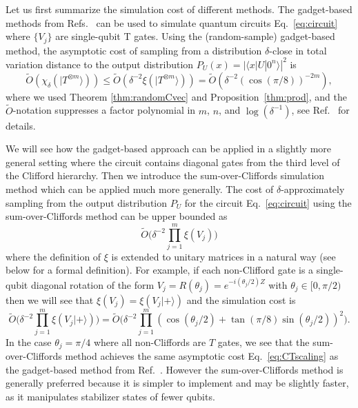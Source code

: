 Let us first summarize the simulation cost of different methods. The gadget-based methods from Refs.~\cite{Bravyi16stabRank, bravyi2016improved} can be used to simulate quantum circuits Eq.~\eqref{eq:circuit} where $\{V_j\}$ are single-qubit T gates. Using the (random-sample) gadget-based method, the asymptotic cost of sampling from a distribution $\delta$-close in total variation distance to the output distribution $P_U(x)=|\langle x|U|0^n\rangle|^2$ is
\begin{equation}
\tilde{O}\left(\chi_{\delta}\left(|T^{\otimes m}\rangle\right)\right)\leq \tilde{O}\left(\delta^{-2} \xi\left(|T^{\otimes m}\rangle\right)\right)=\tilde{O}\left(\delta^{-2}\left(\cos(\pi/8)\right)^{-2m}\right),
\label{eq:CTscaling}
\end{equation}
where we used Theorem \ref{thm:randomCvec} and Proposition~\ref{thm:prod}, and the $\tilde{O}$-notation suppresses a factor polynomial in $m$, $n$, and $\log(\delta^{-1})$, see Ref.~\cite{bravyi2016improved} for details. 


We will see how the gadget-based approach can be applied in a slightly more general setting where the circuit contains diagonal gates from the third level of the Clifford hierarchy. Then we introduce the sum-over-Cliffords simulation method which can be applied much more generally.  The cost of $\delta$-approximately sampling from the output distribution $P_U$ for the circuit Eq.~\eqref{eq:circuit} using the sum-over-Cliffords method can be upper bounded as
\begin{equation}
\tilde{O}\bigg(\delta^{-2} \prod_{j=1}^{m} \xi(V_j)\bigg)
\label{eq:zrot}
\end{equation}
where the definition of $\xi$ is extended to unitary matrices in a natural way (see below for a formal definition). For example, if each non-Clifford gate is a single-qubit diagonal rotation of the form $V_j=R(\theta_j)=e^{-i(\theta_j/2) Z}$ with $\theta_j\in [0, \pi/2)$ then we will see that $\xi(V_j)=\xi(V_j|+\rangle)$ and the simulation cost is
\[
\tilde{O}\bigg(\delta^{-2} \prod_{j=1}^{m} \xi(V_j|+\rangle)\bigg)=\tilde{O}\bigg(\delta^{-2} \prod_{j=1}^{m} \left(\cos(\theta_j/2)+\tan(\pi/8)\sin(\theta_j/2)\right)^2\bigg).
\]
In the case $\theta_j=\pi/4$ where all non-Cliffords are $T$ gates, we see that the sum-over-Cliffords method achieves the same asymptotic cost Eq.~\eqref{eq:CTscaling} as the gadget-based method from Ref.~\cite{bravyi2016improved}. However the sum-over-Cliffords method is generally preferred because it is simpler to implement and may be slightly faster, as it manipulates stabilizer states of fewer qubits.


